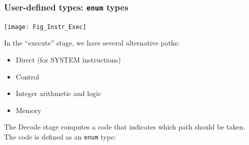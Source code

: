 \begin{frame}[fragile]
\frametitle{User-defined types: {\tt enum} types}

\footnotesize

\begin{center}
 \begin{minipage}{0.55\textwidth}
  \texttt{[image: Fig\_Instr\_Exec]}
 \end{minipage}
 \hm
 \begin{minipage}{0.33\textwidth}
  In the ``execute'' stage, we have several alternative paths:
  \begin{itemize}
   \item Direct (for SYSTEM instructions)
   \item Control
   \item Integer arithmetic and logic
   \item Memory
  \end{itemize}
 \end{minipage}
\end{center}

\vspace{2ex}

The Decode stage computes a code that indicates which path should be taken. \\
The code is defined as an {\tt enum} type:


\end{frame}


